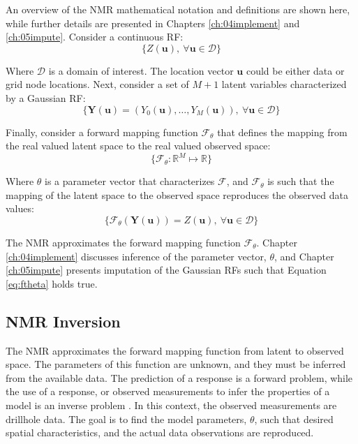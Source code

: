 An overview of the \gls{NMR} mathematical notation and definitions are shown here, while further details are presented in Chapters \ref{ch:04implement} and \ref{ch:05impute}. Consider a continuous \gls{RF}:
\begin{equation}
    \{Z(\mathbf{u}), \ \forall \mathbf{u} \in \mathcal{D}\}
    \label{eq:zu}
\end{equation}

Where $\mathcal{D}$ is a domain of interest. The location vector $\mathbf{u}$ could be either data or grid node locations. Next, consider a set of $M+1$ latent variables characterized by a Gaussian \gls{RF}:
\begin{equation}
    \{\mathbf{Y}(\mathbf{u}) = (Y_{0}(\mathbf{u}), \dots, Y_{M}(\mathbf{u})), \ \forall \mathbf{u} \in \mathcal{D}\}
    \label{eq:gpool}
\end{equation}

Finally, consider a forward mapping function $\mathcal{F}_{\theta}$ that defines the mapping from the real valued latent space to the real valued observed space:
\begin{equation}
    \{\mathcal{F}_{\theta}: \mathbb{R}^{M} \mapsto \mathbb{R} \}
    \label{eq:fmap}
\end{equation}

Where $\theta$ is a parameter vector that characterizes $\mathcal{F}$, and $\mathcal{F}_{\theta}$ is such that the mapping of the latent space to the observed space reproduces the observed data values:
\begin{equation}
    \{\mathcal{F}_{\theta}(\mathbf{Y}(\mathbf{u})) = Z(\mathbf{u}), \ \forall \mathbf{u} \in \mathcal{D}\}
    \label{eq:ftheta}
\end{equation}

The \gls{NMR} approximates the forward mapping function $\mathcal{F}_{\theta}$. Chapter \ref{ch:04implement} discusses inference of the parameter vector, $\theta$, and Chapter \ref{ch:05impute} presents imputation of the Gaussian \glspl{RF} such that Equation \ref{eq:ftheta} holds true.

\subsection{NMR Inversion}
\label{subsec:03nmrinverse}

The \gls{NMR} approximates the forward mapping function from latent to observed space. The parameters of this function are unknown, and they must be inferred from the available data. The prediction of a response is a forward problem, while the use of a response, or observed measurements to infer the properties of a model is an inverse problem \citep{tarantola2005inverse}. In this context, the observed measurements are drillhole data. The goal is to find the model parameters, $\theta$, such that desired spatial characteristics, and the actual data observations are reproduced.



